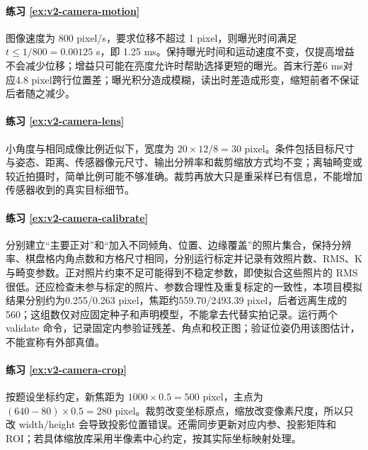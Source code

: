 \paragraph*{练习 \ref{ex:v2-camera-motion}}
\begin{solution}
图像速度为 800 pixel/s，要求位移不超过 1 pixel，则曝光时间满足 $t\le1/800=0.00125$ s，即 1.25 ms。保持曝光时间和运动速度不变，仅提高增益不会减少位移；增益只可能在亮度允许时帮助选择更短的曝光。首末行差6 ms对应4.8 pixel跨行位置差；曝光积分造成模糊，读出时差造成形变，缩短前者不保证后者随之减少。
\end{solution}

\paragraph*{练习 \ref{ex:v2-camera-lens}}
\begin{solution}
小角度与相同成像比例近似下，宽度为 $20\times12/8=30$ pixel。条件包括目标尺寸与姿态、距离、传感器像元尺寸、输出分辨率和裁剪缩放方式均不变；离轴畸变或较近拍摄时，简单比例可能不够准确。裁剪再放大只是重采样已有信息，不能增加传感器收到的真实目标细节。
\end{solution}

\paragraph*{练习 \ref{ex:v2-camera-calibrate}}
\begin{solution}
分别建立“主要正对”和“加入不同倾角、位置、边缘覆盖”的照片集合，保持分辨率、棋盘格内角点数和方格尺寸相同，分别运行标定并记录有效照片数、RMS、K 与畸变参数。正对照片约束不足可能得到不稳定参数，即使拟合这些照片的 RMS 很低。还应检查未参与标定的照片、参数合理性及重复标定的一致性，本项目模拟结果分别约为0.255/0.263 pixel，焦距约559.70/2493.39 pixel，后者远离生成的560；这组数仅对应固定种子和声明模型，不能拿去代替实拍记录。运行两个 validate 命令，记录固定内参验证残差、角点和校正图；验证位姿仍用该图估计，不能宣称有外部真值。
\end{solution}

\paragraph*{练习 \ref{ex:v2-camera-crop}}
\begin{solution}
按题设坐标约定，新焦距为 $1000\times0.5=500$ pixel，主点为 $(640-80)\times0.5=280$ pixel。裁剪改变坐标原点，缩放改变像素尺度，所以只改 width/height 会导致投影位置错误。还需同步更新对应内参、投影矩阵和 ROI；若具体缩放库采用半像素中心约定，按其实际坐标映射处理。
\end{solution}

